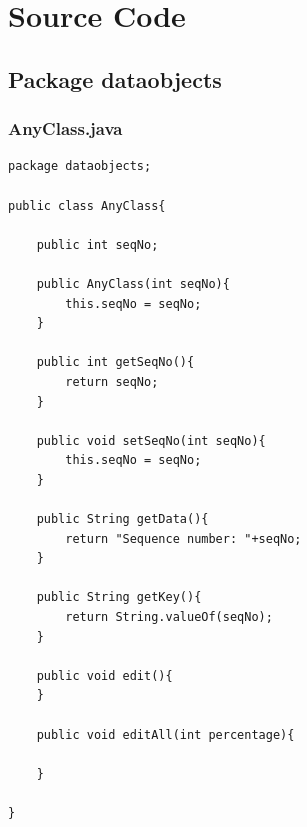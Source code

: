 \documentclass[12pt]{article}
\begin{document}
\bigskip
\newpage
\section{Source Code}
\bigskip

\footnotesize
\subsection{Package dataobjects}
\subsubsection{AnyClass.java}
\begin{lstlisting}
package dataobjects;

public class AnyClass{

    public int seqNo;

    public AnyClass(int seqNo){
        this.seqNo = seqNo;
    }

    public int getSeqNo(){
        return seqNo;
    }

    public void setSeqNo(int seqNo){
        this.seqNo = seqNo;
    }

    public String getData(){
        return "Sequence number: "+seqNo;
    }

    public String getKey(){
        return String.valueOf(seqNo);
    }

    public void edit(){
    }

    public void editAll(int percentage){

    }

}
\end{lstlisting}
\end{document}
